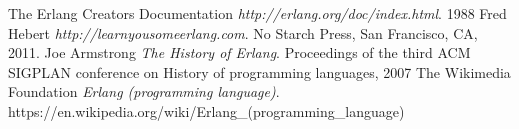 \documentclass[11pt]{article}
\begin{document}
\begin{thebibliography}{9}
    The Erlang Creators Documentation
    \textit{http://erlang.org/doc/index.html}.
    1988
    Fred Hebert
    \textit{http://learnyousomeerlang.com}.
    No Starch Press, San Francisco, CA, 2011.
    Joe Armstrong
    \textit{The History of Erlang}.
    Proceedings of the third ACM SIGPLAN conference on History of programming languages, 2007
    The Wikimedia Foundation
    \textit{Erlang (programming language)}.
    https://en.wikipedia.org/wiki/Erlang\_(programming\_language)

\end{thebibliography}
\end{document}
